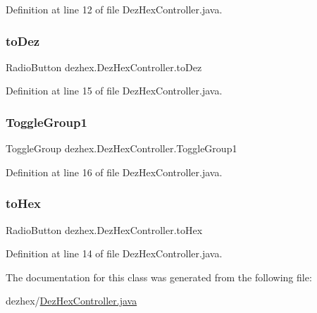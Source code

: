 Definition at line 12 of file Dez\+Hex\+Controller.\+java.

\mbox{\label{classdezhex_1_1_dez_hex_controller_a8d4a5eaa39db2cb0162ce614c3dc66ce}} 
\subsubsection{\texorpdfstring{to\+Dez}{toDez}}
{\footnotesize\ttfamily Radio\+Button dezhex.\+Dez\+Hex\+Controller.\+to\+Dez\hspace{0.3cm}{\ttfamily [private]}}



Definition at line 15 of file Dez\+Hex\+Controller.\+java.

\mbox{\label{classdezhex_1_1_dez_hex_controller_aaf2c68f18e2584591fda888fe5b46578}} 
\subsubsection{\texorpdfstring{Toggle\+Group1}{ToggleGroup1}}
{\footnotesize\ttfamily Toggle\+Group dezhex.\+Dez\+Hex\+Controller.\+Toggle\+Group1\hspace{0.3cm}{\ttfamily [private]}}



Definition at line 16 of file Dez\+Hex\+Controller.\+java.

\mbox{\label{classdezhex_1_1_dez_hex_controller_ab2923a14b89371f8ebd0e52f2a4ba98c}} 
\subsubsection{\texorpdfstring{to\+Hex}{toHex}}
{\footnotesize\ttfamily Radio\+Button dezhex.\+Dez\+Hex\+Controller.\+to\+Hex\hspace{0.3cm}{\ttfamily [private]}}



Definition at line 14 of file Dez\+Hex\+Controller.\+java.



The documentation for this class was generated from the following file\+:\begin{DoxyCompactItemize}
\item 
dezhex/\hyperlink{_dez_hex_controller_8java}{Dez\+Hex\+Controller.\+java}\end{DoxyCompactItemize}

